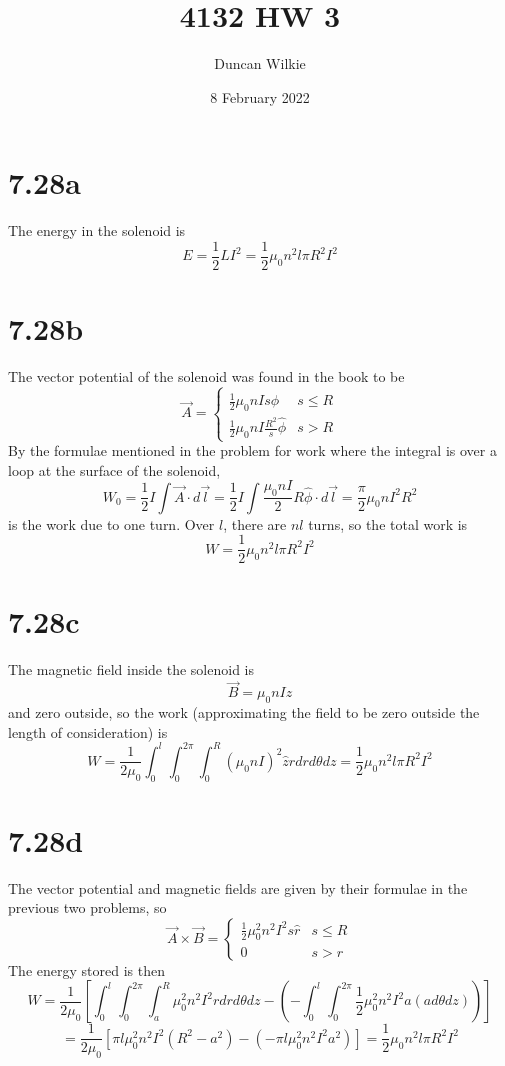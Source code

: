 \documentclass{article}
\title{4132 HW 3}
\author{Duncan Wilkie}
\date{8 February 2022}
\begin{document}
\maketitle

\section*{7.28a}
The energy in the solenoid is
\[E=\frac{1}{2}LI^2=\frac{1}{2}\mu_0n^2l\pi R^2I^2\]
\section*{7.28b}
The vector potential of the solenoid was found in the book to be
\[\vec{A}=\begin{cases} \frac{1}{2}\mu_0nIs\hat{\phi} & s \leq R \\ \frac{1}{2}\mu_0nI\frac{R^2}{s}\hat{\phi} & s > R\end{cases}\]
By the formulae mentioned in the problem for work where the integral is over a loop at the surface of the solenoid,
\[W_0=\frac{1}{2}I\int\vec{A}\cdot d\vec{l}=\frac{1}{2}I\int\frac{\mu_0nI}{2}R\hat{\phi}\cdot d\vec{l}=\frac{\pi}{2}\mu_0nI^2R^2\]
is the work due to one turn. Over $l$, there are $nl$ turns, so the total work is
\[W=\frac{1}{2}\mu_0n^2l\pi R^2I^2\]

\section*{7.28c}
The magnetic field inside the solenoid is
\[\vec{B}=\mu_0nI\hat{z}\]
and zero outside, so the work (approximating the field to be zero outside the length of consideration) is
\[W=\frac{1}{2\mu_0}\int_0^{l}\int_0^{2\pi}\int_0^R(\mu_0nI)^2\hat{z}rdrd\theta dz=\frac{1}{2}\mu_0n^2l\pi R^2 I^2\]

\section*{7.28d}
The vector potential and magnetic fields are given by their formulae in the previous two problems, so
\[\vec{A}\times\vec{B}=\begin{cases}\frac{1}{2}\mu_0^2n^2I^2s\hat{r} & s \leq R \\ 0 & s > r\end{cases}\]
The energy stored is then
\[W=\frac{1}{2\mu_0}\left[ \int_0^l\int_0^{2\pi} \int_a^R \mu_0^2n^2I^2 rdrd\theta dz-\left( -\int_0^l\int_0^{2\pi}\frac{1}{2}\mu_0^2n^2I^2a (a d\theta dz)\right)\right]\]
\[=\frac{1}{2\mu_0}\left[ \pi l\mu_0^2n^2I^2(R^2-a^2)-\left( -\pi l\mu_0^2 n^2I^2a^2 \right) \right]=\frac{1}{2}\mu_0n^2l\pi R^2I^2\]
\end{document}
